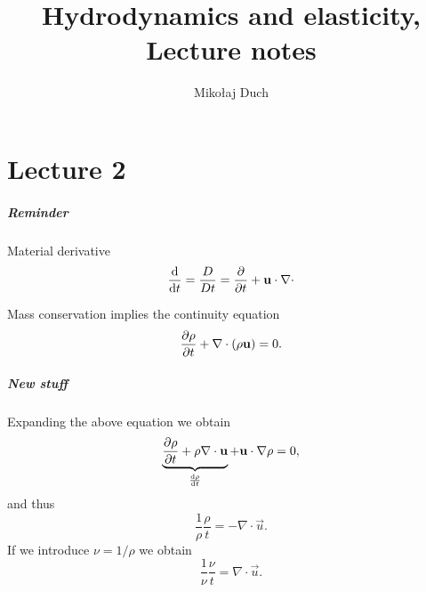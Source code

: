 \documentclass[11pt,oneside]{book}
\title{Hydrodynamics and elasticity,\\ Lecture notes}
\author{Mikołaj Duch}
\theoremstyle{definition} %
\theoremstyle{plain} %
\theoremstyle{remark} %
\theoremstyle{underline}
\begin{document}
  \maketitle
  \frontmatter


  \tableofcontents


  \mainmatter

  


  \chapter{Lecture 2}
  \paragraph{Reminder}
  Material derivative 
  \begin{displaymath}
    \frac{\mathrm{d} }{\mathrm{d} t} = \frac{D}{Dt} = \frac{\partial }{\partial t} + \mathbf{u} \cdot \nabla \cdot
  \end{displaymath}

  Mass conservation implies the continuity equation
  \begin{displaymath}
    \frac{\partial \rho}{\partial t} + \nabla \cdot ( \rho \mathbf{u} ) = 0.
  \end{displaymath}

  \paragraph{New stuff}
  Expanding the above equation we obtain
  \begin{displaymath}
    \underbrace{\frac{\partial \rho}{\partial t} + \rho \nabla \cdot \mathbf{u}}_{\frac{\mathrm{d} \rho}{\mathrm{d} t}} + \mathbf{u} \cdot \nabla \rho = 0,
  \end{displaymath}
  and thus
  \begin{displaymath}
    \frac{1}{\rho} \dfrac{\rho}{t} = - \nabla \cdot \vec u.
  \end{displaymath}
  If we introduce  $\nu = 1 / \rho$ we obtain
  \begin{displaymath}
    \frac{1}{\nu} \dfrac{\nu}{t} = \nabla \cdot \vec u.
  \end{displaymath}
\end{document}
